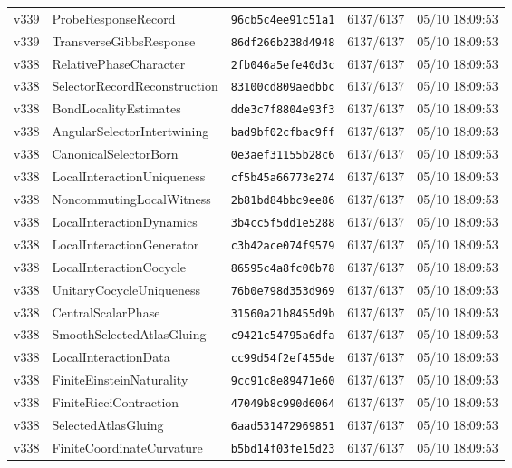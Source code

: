 \documentclass[11pt]{article}
\theoremstyle{definition}\newtheorem{deriv}{Derivação}
\begin{document}
{\begin{longtable}{@{}lllll@{}}
v339 & ProbeResponseRecord & \texttt{96cb5c4ee91c51a1} & 6137/6137 & 05/10 18:09:53 \\
v339 & TransverseGibbsResponse & \texttt{86df266b238d4948} & 6137/6137 & 05/10 18:09:53 \\
v338 & RelativePhaseCharacter & \texttt{2fb046a5efe40d3c} & 6137/6137 & 05/10 18:09:53 \\
v338 & SelectorRecordReconstruction & \texttt{83100cd809aedbbc} & 6137/6137 & 05/10 18:09:53 \\
v338 & BondLocalityEstimates & \texttt{dde3c7f8804e93f3} & 6137/6137 & 05/10 18:09:53 \\
v338 & AngularSelectorIntertwining & \texttt{bad9bf02cfbac9ff} & 6137/6137 & 05/10 18:09:53 \\
v338 & CanonicalSelectorBorn & \texttt{0e3aef31155b28c6} & 6137/6137 & 05/10 18:09:53 \\
v338 & LocalInteractionUniqueness & \texttt{cf5b45a66773e274} & 6137/6137 & 05/10 18:09:53 \\
v338 & NoncommutingLocalWitness & \texttt{2b81bd84bbc9ee86} & 6137/6137 & 05/10 18:09:53 \\
v338 & LocalInteractionDynamics & \texttt{3b4cc5f5dd1e5288} & 6137/6137 & 05/10 18:09:53 \\
v338 & LocalInteractionGenerator & \texttt{c3b42ace074f9579} & 6137/6137 & 05/10 18:09:53 \\
v338 & LocalInteractionCocycle & \texttt{86595c4a8fc00b78} & 6137/6137 & 05/10 18:09:53 \\
v338 & UnitaryCocycleUniqueness & \texttt{76b0e798d353d969} & 6137/6137 & 05/10 18:09:53 \\
v338 & CentralScalarPhase & \texttt{31560a21b8455d9b} & 6137/6137 & 05/10 18:09:53 \\
v338 & SmoothSelectedAtlasGluing & \texttt{c9421c54795a6dfa} & 6137/6137 & 05/10 18:09:53 \\
v338 & LocalInteractionData & \texttt{cc99d54f2ef455de} & 6137/6137 & 05/10 18:09:53 \\
v338 & FiniteEinsteinNaturality & \texttt{9cc91c8e89471e60} & 6137/6137 & 05/10 18:09:53 \\
v338 & FiniteRicciContraction & \texttt{47049b8c990d6064} & 6137/6137 & 05/10 18:09:53 \\
v338 & SelectedAtlasGluing & \texttt{6aad531472969851} & 6137/6137 & 05/10 18:09:53 \\
v338 & FiniteCoordinateCurvature & \texttt{b5bd14f03fe15d23} & 6137/6137 & 05/10 18:09:53 \\

\end{longtable}}
\end{document}
